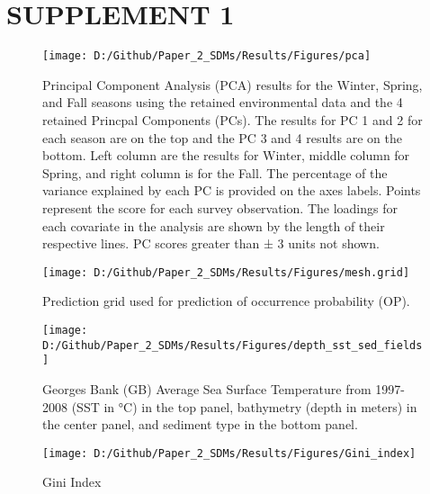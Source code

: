 \documentclass[
]{article}
\begin{document}
\newpage

\hypertarget{ref-sup}{%
\section{SUPPLEMENT 1}\label{ref-sup}}

\setcounter{table}{0}  \renewcommand{\thetable}{S\arabic{table}} \setcounter{figure}{0} \renewcommand{\thefigure}{S\arabic{figure}}

\newpage

\begin{figure}
\texttt{[image: D:/Github/Paper\_2\_SDMs/Results/Figures/pca]} \caption{Principal Component Analysis (PCA) results for the Winter, Spring, and Fall seasons using the retained environmental data and the 4 retained Princpal Components (PCs). The results for PC 1 and 2 for each season are on the top and the PC 3 and 4 results are on the bottom.  Left column are the results for Winter, middle column for Spring, and right column is for the Fall. The percentage of the variance explained by each PC is provided on the axes labels.  Points represent the score for each survey observation.  The loadings for each covariate in the analysis are shown by the length of their respective lines. PC scores greater than ± 3 units not shown.}\label{fig:PCA}
\end{figure}

\newpage

\clearpage
\begin{figure}
\texttt{[image: D:/Github/Paper\_2\_SDMs/Results/Figures/mesh.grid]} \caption{Prediction grid used for prediction of occurrence probability (OP).}\label{fig:mesh-grid}
\end{figure}

\clearpage
\begin{figure}
\texttt{[image: D:/Github/Paper\_2\_SDMs/Results/Figures/depth\_sst\_sed\_fields]} \caption{Georges Bank (GB) Average Sea Surface Temperature from 1997-2008 (SST in °C) in the top panel, bathymetry (depth in meters) in the center panel, and sediment type in the bottom panel.}\label{fig:SST-Dep-Sed}
\end{figure}

\begin{landscape} 
\begin{figure}
\texttt{[image: D:/Github/Paper\_2\_SDMs/Results/Figures/Gini\_index]} \caption{Gini Index }\label{fig:gini-index}
\end{figure}
\end{landscape}
\end{document}
